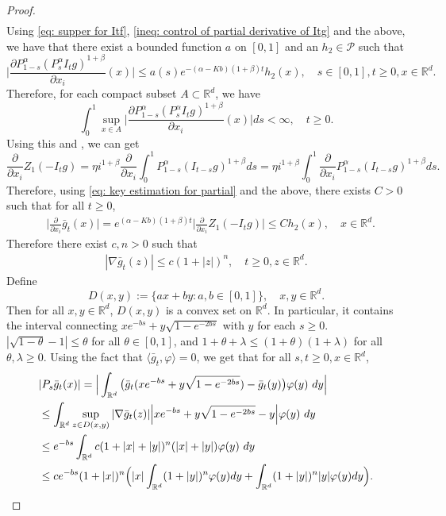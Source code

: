\documentclass[12pt,a4paper]{amsart}
\theoremstyle{plain}
\theoremstyle{definition}
\numberwithin{equation}{section}
\begin{document}
\begin{proof}
\begin{align}
\end{align}
Using \eqref{eq: supper for Itf}, \eqref{ineq: control of partial derivative of Itg} and the above, we have that there exist a bounded function $a$ on $[0,1]$ and an $h_2 \in \mathcal P$ such that
\begin{equation}
  \label{eq: key estimation for partial}
  \Big| \frac{\partial P_{1-s}^\alpha  (P_s^\alpha I_t g)^{1+\beta}}{\partial x_i}  (x)\Big| \leq a(s) e^{-(\alpha - Kb)(1+\beta)t}h_2(x),\quad s\in [0,1],t\geq 0, x\in \mathbb R^d.
\end{equation}
Therefore, for each compact subset $A \subset \mathbb R^d$, we have
\[
  \int_0^1 \sup_{x\in A} \Big|\frac{\partial P_{1-s}^\alpha  (P_s^\alpha I_t g)^{1+\beta}}{\partial x_i}  (x)\Big| ds 
  < \infty
  , \quad t\geq 0.
\]
Using this and \cite[Theorem A.5.2]{Durrett2010Probability}, we can get
\[
  \frac{\partial}{\partial x_i} Z_1(-I_tg)
  = \eta i^{1+\beta}  \frac{\partial}{\partial x_i} \int_0^1 P_{1-s}^\alpha (I_{t-s}g)^{1+\beta} ds
  = \eta i^{1+\beta}  \int_0^1  \frac{\partial}{\partial x_i} P_{1-s}^\alpha (I_{t-s}g)^{1+\beta} ds.
\]
Therefore, using \eqref{eq: key estimation for partial} and the above, there exists  $C> 0$ such that for all $t\geq 0$,
\begin{align}
  & \Big|\frac{\partial}{\partial x_i}\bar{g}_t(x)\Big|
    = e^{(\alpha-Kb)(1+\beta)t}\Big|\frac{\partial}{\partial x_i}Z_1(-I_tg)\Big| \leq C h_2(x),
    \quad x\in \mathbb R^d.
\end{align}
Therefore there exist $c,n>0$ such that
\begin{align}
  \label{ineq: control of sup gt}
  | \nabla \bar g_t (z)|
  \leq c(1+|z|)^n
  , \quad t\geq 0, z\in \mathbb R^d.
\end{align}
Define
\[
  D(x,y)
  := \{ax+by: a,b\in [0,1]\}
  , \quad x, y \in \mathbb R^d.
\]
Then for all $x,y\in \mathbb R^d$, $D(x,y)$ is a convex set on $\mathbb R^d$.
In particular, it contains the interval connecting $xe^{-bs}+y\sqrt{1-e^{-2bs}}$ with $y$ for each $s\geq 0$.
$ | \sqrt { 1 - \theta } - 1 | \leq \theta $ for all $ \theta \in [ 0, 1 ] $,
and
$ 1 + \theta + \lambda \leq ( 1 + \theta ) ( 1 + \lambda ) $ for all $ \theta, \lambda \geq 0$.
Using the fact that $\langle \bar{g}_t,\varphi\rangle = 0$, we get that for all $s,t\geq 0, x\in \mathbb R^d$,
\begin{align}
  & |P_s\bar{g}_t(x)|
    = \Big|\int_{\mathbb R^d} \big(\bar {g}_t(xe^{-bs}+y\sqrt{1-e^{-2bs}})-\bar {g}_t (y)\big) \varphi(y)~dy \Big| \\
  & \leq \int_{\mathbb R^d} \sup_{z\in D(x,y)} |\nabla \bar g_t (z)|\Big|xe^{-bs}+y\sqrt{1-e^{-2bs}}-y \Big| \varphi(y)~dy \\
  & \leq e^{-bs}\int_{\mathbb R^d} c(1+|x|+|y|)^n (|x|+|y|) \varphi(y)~dy \\
  & \leq ce^{-bs}(1+|x|)^n\Big(|x|\int_{\mathbb R^d} (1+|y|)^n\varphi(y)dy + \int_{\mathbb R^d}(1+|y|)^n|y|\varphi(y)dy\Big).
  \qedhere
\end{align}
\end{proof}
\end{document}
